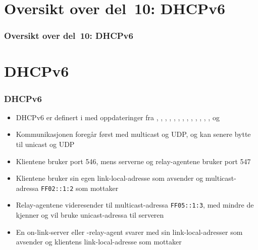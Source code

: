 \section*{Oversikt over del~10: DHCPv6}
\begin{frame}
  \frametitle{Oversikt over del~10: DHCPv6}
    \tableofcontents
\end{frame}

\section{DHCPv6}
\begin{frame}
  \frametitle{DHCPv6}
  \begin{itemize}
  \item DHCPv6 er definert i  med oppdateringer fra
    , , , , ,
    , , , , ,
    , , ,  og 
  \item Kommunikasjonen foregår først med multicast og UDP, og kan
    senere bytte til unicast og UDP
  \item Klientene bruker port 546, mens serverne og relay-agentene
    bruker port 547
  \item Klientene bruker sin egen link-local-adresse som avsender og
    multicast-adressa \texttt{FF02::1:2} som mottaker
  \item Relay-agentene videresender til multicast-adressa
    \texttt{FF05::1:3}, med mindre de kjenner og vil bruke
    unicast-adressa til serveren
  \item En on-link-server eller -relay-agent svarer med sin
    link-local-adresser som avsender og klientens link-local-adresse
    som mottaker
  \end{itemize}
\end{frame}

